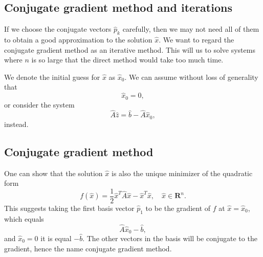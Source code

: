 \documentclass[%
oneside,                 %
final,                   %
10pt]{article}
\begin{document}
\subsection{Conjugate gradient method and iterations}
\begin{block}{}

If we choose the conjugate vectors $\hat{p}_k$ carefully, 
then we may not need all of them to obtain a good approximation to the solution 
$\hat{x}$. 
We want to regard the conjugate gradient method as an iterative method. 
This will us to solve systems where $n$ is so large that the direct 
method would take too much time.

We denote the initial guess for $\hat{x}$ as $\hat{x}_0$. 
We can assume without loss of generality that
\begin{equation*}
\hat{x}_0=0,
\end{equation*}
or consider the system
\begin{equation*}
\hat{A}\hat{z} = \hat{b}-\hat{A}\hat{x}_0,
\end{equation*}
instead.
\end{block}

\subsection{Conjugate gradient method}
\begin{block}{}
One can show that the solution $\hat{x}$ is also the unique minimizer of the quadratic form
\begin{equation*}
  f(\hat{x}) = \frac{1}{2}\hat{x}^T\hat{A}\hat{x} - \hat{x}^T \hat{x} , \quad \hat{x}\in\mathbf{R}^n. 
\end{equation*}
This suggests taking the first basis vector $\hat{p}_1$ 
to be the gradient of $f$ at $\hat{x}=\hat{x}_0$, 
which equals
\begin{equation*}
\hat{A}\hat{x}_0-\hat{b},
\end{equation*}
and 
$\hat{x}_0=0$ it is equal $-\hat{b}$.
The other vectors in the basis will be conjugate to the gradient, 
hence the name conjugate gradient method.
\end{block}

\end{document}
